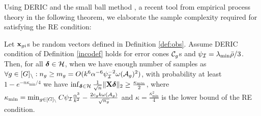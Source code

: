 %


 Using DERIC and the small ball method \cite{mend15}, a recent tool from empirical process theory in the following theorem, we elaborate the sample complexity required for satisfying the RE condition:
\begin{theorem}
	\label{theo:re}
	Let $\mathbf{x}_{gi}$s	be random vectors defined in Definition \ref{def:obs}.
	Assume DERIC condition of Definition \ref{incodef} holds for error cones ${\cal C}_g$s and $\psi_{{\cal{I}}}=\lambda_{\min}\bar{\rho}/3$.
	Then, for all $\boldsymbol{\delta} \in {\cal H}$, when we have enough number of samples as $\forall g \in [G]_{\setminus}: n_g \geq m_g = O(k^6 \alpha^{-6} \psi_{{\cal{I}}}^{-2} \omega({\cal A}_g)^2)$, with probability at least $1 - e^{-n \kappa_{\min}/4}$  we have 
	$\inf_{\boldsymbol{\delta} \in {\cal H}} \frac{1}{\sqrt{n}} \|\mathbf{X} \boldsymbol{\delta}\|_{2} \geq \frac{\kappa_{\min}}{2}$,
	where $\kappa_{\min} = \min_{g\in [G]_\setminus} C \psi_{{\cal{I}}} \frac{\alpha^3}{k^2}  - \frac{2 c_g k \omega({\cal A}_g)}{\sqrt{n_g}}$ and $\kappa = \frac{\kappa_{\min}^2}{4}$ is the lower bound of the RE condition.
\end{theorem}

